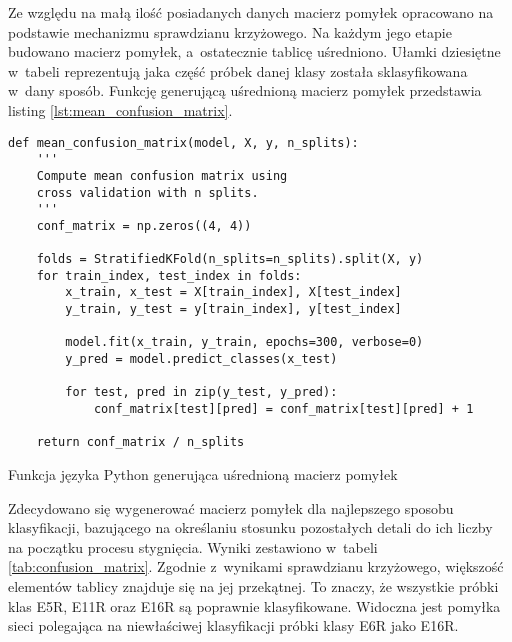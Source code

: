 Ze względu na małą ilość posiadanych danych macierz pomyłek opracowano
na podstawie mechanizmu sprawdzianu krzyżowego.
Na każdym jego etapie budowano macierz pomyłek, a~ostatecznie tablicę
uśredniono.
Ułamki dziesiętne w~tabeli reprezentują jaka część próbek danej klasy
została sklasyfikowana w~dany sposób.
Funkcję generującą uśrednioną macierz pomyłek przedstawia listing
\ref{lst:mean_confusion_matrix}.
\begin{listing}[htb]
\begin{verbatim}
def mean_confusion_matrix(model, X, y, n_splits):
    '''
    Compute mean confusion matrix using
    cross validation with n splits.
    '''
    conf_matrix = np.zeros((4, 4))

    folds = StratifiedKFold(n_splits=n_splits).split(X, y)
    for train_index, test_index in folds:
        x_train, x_test = X[train_index], X[test_index]
        y_train, y_test = y[train_index], y[test_index]

        model.fit(x_train, y_train, epochs=300, verbose=0)
        y_pred = model.predict_classes(x_test)

        for test, pred in zip(y_test, y_pred):
            conf_matrix[test][pred] = conf_matrix[test][pred] + 1

    return conf_matrix / n_splits
\end{verbatim}
\caption{Funkcja języka Python generująca uśrednioną macierz pomyłek}
\label{lst:mean_confusion_matrix}
\end{listing}

Zdecydowano się wygenerować macierz pomyłek dla najlepszego sposobu
klasyfikacji, bazującego na określaniu stosunku pozostałych detali
do ich liczby na początku procesu stygnięcia.
Wyniki zestawiono w~tabeli \ref{tab:confusion_matrix}.
Zgodnie z~wynikami sprawdzianu krzyżowego, większość elementów tablicy znajduje
się na jej przekątnej.
To znaczy, że wszystkie próbki klas E5R, E11R oraz E16R są poprawnie
klasyfikowane.
Widoczna jest pomyłka sieci polegająca na niewłaściwej klasyfikacji próbki
klasy E6R jako E16R.

